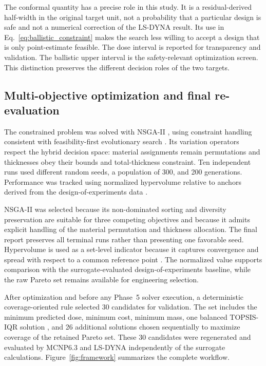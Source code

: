 \documentclass[12pt]{elsarticle}
\begin{document}
	The conformal quantity has a precise role in this study. It is a residual-derived half-width in the original target unit, not a probability that a particular design is safe and not a numerical correction of the LS-DYNA result. Its use in Eq.~\eqref{eq:ballistic_constraint} makes the search less willing to accept a design that is only point-estimate feasible. The dose interval is reported for transparency and validation. The ballistic upper interval is the safety-relevant optimization screen. This distinction preserves the different decision roles of the two targets.
	
	\subsection{Multi-objective optimization and final re-evaluation}
	
	The constrained problem was solved with NSGA-II \cite{Deb2002NSGAII}, using constraint handling consistent with feasibility-first evolutionary search \cite{Deb2000Constraints}. Its variation operators respect the hybrid decision space: material assignments remain permutations and thicknesses obey their bounds and total-thickness constraint. Ten independent runs used different random seeds, a population of 300, and 200 generations. Performance was tracked using normalized hypervolume relative to anchors derived from the design-of-experiments data \cite{EmmerichDeutz2018}.
	
	NSGA-II was selected because its non-dominated sorting and diversity preservation are suitable for three competing objectives and because it admits explicit handling of the material permutation and thickness allocation. The final report preserves all terminal runs rather than presenting one favorable seed. Hypervolume is used as a set-level indicator because it captures convergence and spread with respect to a common reference point \cite{ZitzlerThiele1999,EmmerichDeutz2018}. The normalized value supports comparison with the surrogate-evaluated design-of-experiments baseline, while the raw Pareto set remains available for engineering selection.
	
	After optimization and before any Phase~5 solver execution, a deterministic coverage-oriented rule selected 30 candidates for validation. The set includes the minimum predicted dose, minimum cost, minimum mass, one balanced TOPSIS-IQR solution \cite{HwangYoon1981TOPSIS}, and 26 additional solutions chosen sequentially to maximize coverage of the retained Pareto set. These 30 candidates were regenerated and evaluated by MCNP6.3 and LS-DYNA independently of the surrogate calculations. Figure~\ref{fig:framework} summarizes the complete workflow.
	
\end{document}
